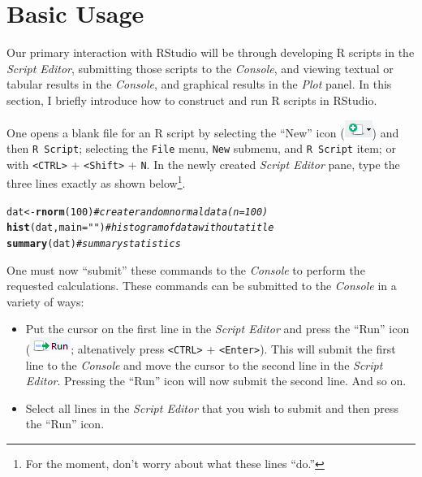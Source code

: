 \documentclass{article}\usepackage[]{graphicx}\usepackage[]{color}
\makeatletter
\newcommand{\hlnum}[1]{\textcolor[rgb]{0.686,0.059,0.569}{#1}}%
\newcommand{\hlstr}[1]{\textcolor[rgb]{0.192,0.494,0.8}{#1}}%
\newcommand{\hlcom}[1]{\textcolor[rgb]{0.678,0.584,0.686}{\textit{#1}}}%
\newcommand{\hlstd}[1]{\textcolor[rgb]{0.345,0.345,0.345}{#1}}%
\newcommand{\hlkwb}[1]{\textcolor[rgb]{0.69,0.353,0.396}{#1}}%
\newcommand{\hlkwc}[1]{\textcolor[rgb]{0.333,0.667,0.333}{#1}}%
\newcommand{\hlkwd}[1]{\textcolor[rgb]{0.737,0.353,0.396}{\textbf{#1}}}%
\newenvironment{kframe}{%
 \def\at@end@of@kframe{}%
 \ifinner\ifhmode%
  \def\at@end@of@kframe{\end{minipage}}%
  \begin{minipage}{\columnwidth}%
 \fi\fi%
 \def\FrameCommand##1{\hskip\@totalleftmargin \hskip-\fboxsep
 \colorbox{shadecolor}{##1}\hskip-\fboxsep
     \hskip-\linewidth \hskip-\@totalleftmargin \hskip\columnwidth}%
 \MakeFramed {\advance\hsize-\width
   \@totalleftmargin\z@ \linewidth\hsize
   \@setminipage}}%
 {\par\unskip\endMakeFramed%
 \at@end@of@kframe}
\newenvironment{knitrout}{}{} %
\makeatother
\begin{document}
\section{Basic Usage}
Our primary interaction with RStudio will be through developing R scripts in the \textit{Script Editor}, submitting those scripts to the \textit{Console}, and viewing textual or tabular results in the \textit{Console}, and graphical results in the \textit{Plot} panel.  In this section, I briefly introduce how to construct and run R scripts in RStudio.

One opens a blank file for an R script by selecting the ``New'' icon (\includegraphics[scale=0.8]{Figs/RStudio_Icon_New.png}) and then \texttt{R Script}; selecting the \texttt{File} menu, \texttt{New} submenu, and \texttt{R Script} item; or with \verb+<CTRL>+ + \verb+<Shift>+ + \verb+N+.  In the newly created \textit{Script Editor} pane, type the three lines exactly as shown below\footnote{For the moment, don't worry about what these lines ``do.''}.

\begin{knitrout}
\color{fgcolor}\begin{kframe}
\begin{alltt}
\hlstd{dat} \hlkwb{<-} \hlkwd{rnorm}\hlstd{(}\hlnum{100}\hlstd{)}    \hlcom{# create random normal data (n=100)}
\hlkwd{hist}\hlstd{(dat,}\hlkwc{main}\hlstd{=}\hlstr{""}\hlstd{)}    \hlcom{# histogram of data without a title}
\hlkwd{summary}\hlstd{(dat)}         \hlcom{# summary statistics}
\end{alltt}
\end{kframe}
\end{knitrout}

One must now ``submit'' these commands to the \textit{Console} to perform the requested calculations.  These commands can be submitted to the \textit{Console} in a variety of ways:

\begin{itemize}
  \item Put the cursor on the first line in the \textit{Script Editor} and press the ``Run'' icon (\includegraphics[scale=0.8]{Figs/RStudio_Icon_Run.png}; altenatively press \verb+<CTRL>+ + \verb+<Enter>+).  This will submit the first line to the \textit{Console} and move the cursor to the second line in the \textit{Script Editor}.  Pressing the ``Run'' icon will now submit the second line.  And so on.
  \item Select all lines in the \textit{Script Editor} that you wish to submit and then press the ``Run'' icon.
\end{itemize}
\end{document}
